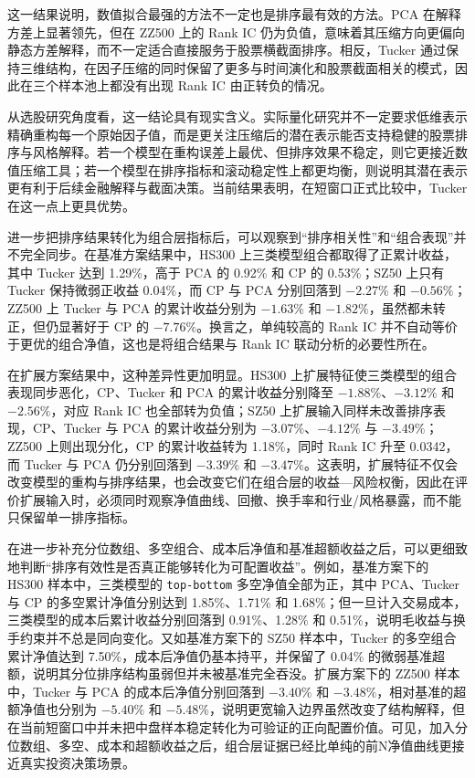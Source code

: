 这一结果说明，数值拟合最强的方法不一定也是排序最有效的方法。PCA 在解释方差上显著领先，但在 ZZ500 上的 Rank IC 仍为负值，意味着其压缩方向更偏向静态方差解释，而不一定适合直接服务于股票横截面排序。相反，Tucker 通过保持三维结构，在因子压缩的同时保留了更多与时间演化和股票截面相关的模式，因此在三个样本池上都没有出现 Rank IC 由正转负的情况。

从选股研究角度看，这一结论具有现实含义。实际量化研究并不一定要求低维表示精确重构每一个原始因子值，而是更关注压缩后的潜在表示能否支持稳健的股票排序与风格解释。若一个模型在重构误差上最优、但排序效果不稳定，则它更接近数值压缩工具；若一个模型在排序指标和滚动稳定性上都更均衡，则说明其潜在表示更有利于后续金融解释与截面决策。当前结果表明，在短窗口正式比较中，Tucker 在这一点上更具优势。

进一步把排序结果转化为组合层指标后，可以观察到“排序相关性”和“组合表现”并不完全同步。在基准方案结果中，HS300 上三类模型组合都取得了正累计收益，其中 Tucker 达到 1.29\%，高于 PCA 的 0.92\% 和 CP 的 0.53\%；SZ50 上只有 Tucker 保持微弱正收益 0.04\%，而 CP 与 PCA 分别回落到 $-2.27\%$ 和 $-0.56\%$；ZZ500 上 Tucker 与 PCA 的累计收益分别为 $-1.63\%$ 和 $-1.82\%$，虽然都未转正，但仍显著好于 CP 的 $-7.76\%$。换言之，单纯较高的 Rank IC 并不自动等价于更优的组合净值，这也是将组合结果与 Rank IC 联动分析的必要性所在。

在扩展方案结果中，这种差异性更加明显。HS300 上扩展特征使三类模型的组合表现同步恶化，CP、Tucker 和 PCA 的累计收益分别降至 $-1.88\%$、$-3.12\%$ 和 $-2.56\%$，对应 Rank IC 也全部转为负值；SZ50 上扩展输入同样未改善排序表现，CP、Tucker 与 PCA 的累计收益分别为 $-3.07\%$、$-4.12\%$ 与 $-3.49\%$；ZZ500 上则出现分化，CP 的累计收益转为 1.18\%，同时 Rank IC 升至 0.0342，而 Tucker 与 PCA 仍分别回落到 $-3.39\%$ 和 $-3.47\%$。这表明，扩展特征不仅会改变模型的重构与排序结果，也会改变它们在组合层的收益—风险权衡，因此在评价扩展输入时，必须同时观察净值曲线、回撤、换手率和行业/风格暴露，而不能只保留单一排序指标。

在进一步补充分位数组、多空组合、成本后净值和基准超额收益之后，可以更细致地判断“排序有效性是否真正能够转化为可配置收益”。例如，基准方案下的 HS300 样本中，三类模型的 \texttt{top-bottom} 多空净值全部为正，其中 PCA、Tucker 与 CP 的多空累计净值分别达到 1.85\%、1.71\% 和 1.68\%；但一旦计入交易成本，三类模型的成本后累计收益分别回落到 0.91\%、1.28\% 和 0.51\%，说明毛收益与换手约束并不总是同向变化。又如基准方案下的 SZ50 样本中，Tucker 的多空组合累计净值达到 7.50\%，成本后净值仍基本持平，并保留了 0.04\% 的微弱基准超额，说明其分位排序结构虽弱但并未被基准完全吞没。扩展方案下的 ZZ500 样本中，Tucker 与 PCA 的成本后净值分别回落到 $-3.40\%$ 和 $-3.48\%$，相对基准的超额净值也分别为 $-5.40\%$ 和 $-5.48\%$，说明更宽输入边界虽然改变了结构解释，但在当前短窗口中并未把中盘样本稳定转化为可验证的正向配置价值。可见，加入分位数组、多空、成本和超额收益之后，组合层证据已经比单纯的前N净值曲线更接近真实投资决策场景。

